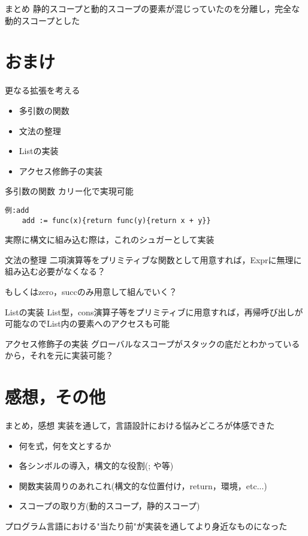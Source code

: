 \documentclass[uplatex,dvipdfmx,ja=standard]{beamer}
\begin{document}
\begin{frame}{まとめ}
静的スコープと動的スコープの要素が混じっていたのを分離し，完全な動的スコープとした
\end{frame}

\section{おまけ}

\begin{frame}{更なる拡張を考える}
    \begin{itemize}
        \item 多引数の関数
        \item 文法の整理
        \item Listの実装
        \item アクセス修飾子の実装
    \end{itemize}
\end{frame}

\begin{frame}[fragile]{多引数の関数}
    カリー化で実現可能
    \begin{verbatim}
例:add
    add := func(x){return func(y){return x + y}}
    \end{verbatim}
    実際に構文に組み込む際は，これのシュガーとして実装
\end{frame}

\begin{frame}{文法の整理}
二項演算等をプリミティブな関数として用意すれば，Exprに無理に組み込む必要がなくなる？

もしくはzero，succのみ用意して組んでいく？
\end{frame}

\begin{frame}[fragile]{Listの実装}
List型，cons演算子等をプリミティブに用意すれば，再帰呼び出しが可能なのでList内の要素へのアクセスも可能

\end{frame}

\begin{frame}[fragile]{アクセス修飾子の実装}
グローバルなスコープがスタックの底だとわかっているから，それを元に実装可能？
\end{frame}

\section{感想，その他}

\begin{frame}{まとめ，感想}
実装を通して，言語設計における悩みどころが体感できた
    \begin{itemize}
        \item 何を式，何を文とするか
        \item 各シンボルの導入，構文的な役割(; や{}等)
        \item 関数実装周りのあれこれ(構文的な位置付け，return，環境，etc...)
        \item スコープの取り方(動的スコープ，静的スコープ)
    \end{itemize}

プログラム言語における"当たり前"が実装を通してより身近なものになった
\end{frame}
\end{document}
